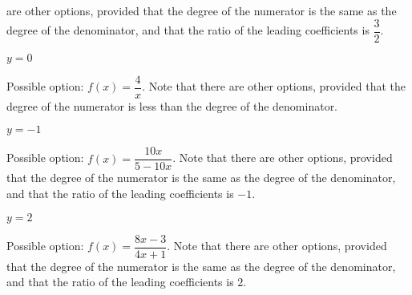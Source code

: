 \begin{exercises}
\begin{problem}
\begin{multicols}{4}
\begin{subproblem}
\begin{shortsolution}
			are other options, provided that the degree of the numerator is the same as the degree
			of the denominator, and that the ratio of the leading 
			coefficients is $\dfrac{3}{2}$.
		\end{shortsolution}
	\end{subproblem}
	\begin{subproblem}
		$y=0$ 
		\begin{shortsolution}
			Possible option: $f(x)=\dfrac{4}{x}$. Note that there
			are other options, provided that the degree of the numerator is less than the degree
			of the denominator.
		\end{shortsolution}
	\end{subproblem}
	\begin{subproblem}
		$y=-1$ 
		\begin{shortsolution}
			Possible option: $f(x)=\dfrac{10x}{5-10x}$. Note that there
			are other options, provided that the degree of the numerator is the same as the degree
			of the denominator, and that the ratio of the leading 
			coefficients is $-1$.
		\end{shortsolution}
	\end{subproblem}
	\begin{subproblem}
		$y=2$ 
		\begin{shortsolution}
			Possible option: $f(x)=\dfrac{8x-3}{4x+1}$. Note that there
			are other options, provided that the degree of the numerator is the same as the degree
			of the denominator, and that the ratio of the leading 
			coefficients is $2$.
		\end{shortsolution}
	\end{subproblem}
\end{multicols}
\end{problem}


\end{exercises}
